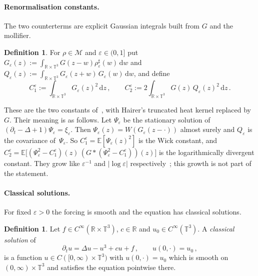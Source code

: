 \documentclass[11pt,letterpaper]{article}
\numberwithin{equation}{section}
\theoremstyle{plain}
\theoremstyle{definition}
\newtheorem{definition}[proposition]{Definition}
\theoremstyle{remark}
\newcommand{\R}{\mathbb{R}}
\newcommand{\T}{\mathbb{T}^3}
\newcommand{\E}{\mathbb{E}}
\newcommand{\Mol}{\mathcal{M}}
\newcommand{\1}{\mathbf{1}}
\newcommand{\dd}{\mathrm{d}}
\begin{document}
\paragraph{Renormalisation constants.} The two counterterms are explicit Gaussian integrals built from $G$ and the mollifier.

\begin{definition}
\label{d.constants}
For $\rho\in\Mol$ and $\varepsilon\in(0,1]$ put $G_\varepsilon(z):=\int_{\R\times\T}G(z-w)\rho^\sharp_\varepsilon(w)\,\dd w$ and $Q_\varepsilon(z):=\int_{\R\times\T}G_\varepsilon(z+w)\,G_\varepsilon(w)\,\dd w$, and define
\begin{equation}
\label{e.constants}
C_1^\varepsilon := \int_{\R\times\T}G_\varepsilon(z)^2\,\dd z\,, \qquad C_2^\varepsilon := 2\int_{\R\times\T}G(z)\,Q_\varepsilon(z)^2\,\dd z\,.
\end{equation}
\end{definition}

These are the two constants of~\cite[(10.33) and (10.41)]{Hai14}, with Hairer's truncated heat kernel replaced by~$G$. Their meaning is as follows. Let $\Psi_\varepsilon$ be the stationary solution of $(\partial_t-\Delta+1)\Psi_\varepsilon=\xi_\varepsilon$. Then $\Psi_\varepsilon(z)=W(G_\varepsilon(z-\cdot))$ almost surely and $Q_\varepsilon$ is the covariance of~$\Psi_\varepsilon$. So $C_1^\varepsilon=\E[\Psi_\varepsilon(z)^2]$ is the Wick constant, and $C_2^\varepsilon=\E\bigl[(\Psi_\varepsilon^2-C_1^\varepsilon)(z)\,(G*(\Psi_\varepsilon^2-C_1^\varepsilon))(z)\bigr]$ is the logarithmically divergent constant. They grow like $\varepsilon^{-1}$ and $|\log\varepsilon|$ respectively~\cite[Remark~10.23]{Hai14}; this growth is not part of the statement.

\paragraph{Classical solutions.} For fixed $\varepsilon>0$ the forcing is smooth and the equation has classical solutions.

\begin{definition}
\label{d.classical}
Let $f\in C^\infty(\R\times\T)$, $c\in\R$ and $u_0\in C^\infty(\T)$. A \emph{classical solution} of
\begin{equation}
\label{e.classical}
\partial_tu=\Delta u-u^3+cu+f\,, \qquad u(0,\cdot)=u_0\,,
\end{equation}
is a function $u\in C([0,\infty)\times\T)$ with $u(0,\cdot)=u_0$ which is smooth on $(0,\infty)\times\T$ and satisfies the equation pointwise there.
\end{definition}
\end{document}
